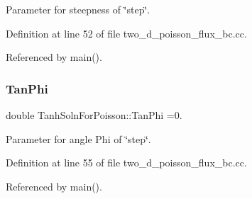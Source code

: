 Parameter for steepness of \char`\"{}step\char`\"{}. 



Definition at line 52 of file two\+\_\+d\+\_\+poisson\+\_\+flux\+\_\+bc.\+cc.



Referenced by main().

\mbox{\label{namespaceTanhSolnForPoisson_a785ccd00a727125a5138fbbcac173294}} 
\subsubsection{\texorpdfstring{Tan\+Phi}{TanPhi}}
{\footnotesize\ttfamily double Tanh\+Soln\+For\+Poisson\+::\+Tan\+Phi =0.}



Parameter for angle Phi of \char`\"{}step\char`\"{}. 



Definition at line 55 of file two\+\_\+d\+\_\+poisson\+\_\+flux\+\_\+bc.\+cc.



Referenced by main().

